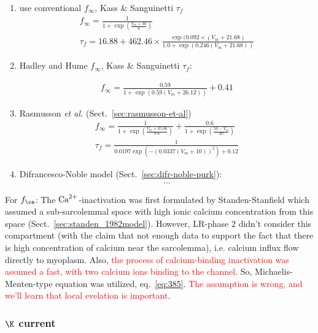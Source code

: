 \begin{framed}
  \begin{enumerate}
  \item use conventional $f_\infty$, Kass \& Sanguinetti $\tau_f$
    \begin{align}
      \label{eq:941}
      f_\infty = \frac{1}{1+\exp(\frac{V_m+30}{8})} \\
      \tau_f = 16.88 + 462.46 \times \frac{\exp(0.092\times(V_m+21.68)}{1.0+\exp(0.246(V_m+21.68))} 
    \end{align}

  \item Hadley and Hume $f_\infty$, Kass \& Sanguinetti $\tau_f$:

    \begin{align}
      \label{eq:942}    
      f_\infty = \frac{0.59}{1+\exp(0.59(V_m+26.12))}+0.41
    \end{align}
  \item Rasmusson {\it et al.} (Sect.~\ref{sec:rasmusson-et-al})
    \begin{align}
      \label{eq:943}
      f_\infty = \frac{1}{1+\exp(\frac{V_m+35.06}{8.6})} + \frac{0.6}{1+\exp(\frac{50-V_m}{20})} \\
      \tau_f = \frac{1}{ 0.0197\exp\left(-(0.0337(V_m+10))^2 \right) + 0.12}
    \end{align}
  \item Difrancesco-Noble model (Sect.~\ref{sec:difr-noble-purk}):
    \begin{align}
      \label{eq:944}
      ...
    \end{align}
  \end{enumerate}
\end{framed}

For $f_\ca$: The ${\text{Ca}^{2+}}$-inactivation was first formulated by Standen-Stanfield
which assumed a sub-sarcolemmal space with high ionic calcium concentration from
this space (Sect.~\ref{sec:standen_1982model}). However, LR-phase 2 didn't
consider this compartment (with the claim that not enough data to support the
fact that there is high concentration of calcium near the sarcolemma), i.e.
calcium influx flow directly to myoplasm. Also, \textcolor{red}{the process of
calcium-binding inactivation was assumed
  a fast, with two calcium ions binding to the channel}.
So, Michaelis-Menten-type equation was utilized, eq.~\eqref{eq:385}.
\textcolor{red}{The assumption is wrong, and we'll learn that local evelation is
important}.

\subsubsection{$\K$ current}

